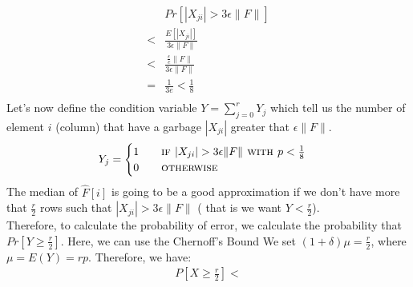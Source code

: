 \documentclass[a4paper]{article}
\begin{document}
\begin{align*}
& Pr[|X_{ji}|>   3\epsilon \|F\| ]\\
<&\frac{E[|X_{ji}|]}{3\epsilon \|F\|}\\
<& \frac{\frac{\epsilon}{e} \|F\|}{3\epsilon \|F\|}\\
=& \frac{1}{3e } < \frac{1}{8}\\
\end{align*}
Let's now define the condition variable $Y=\sum_{j=0}^r Y_j$ which tell us the number of element $i$ (column) that have a garbage $|X_{ji}|$ greater that $\epsilon \|F\|$. 
\begin{equation}
Y_{j} =  
\begin{cases} 
1 \qquad \textsc{if } |X_{ji}|>   3\epsilon \|F\|\textsc{ with } p<\frac{1}{8}\\
0 \qquad \textsc{otherwise}
\end{cases}
\nonumber
\end{equation}
The median of $\hat{F}[i]$ is going to be a good approximation if we don't have more that $\frac{r}{2}$ rows such that $|X_{ji}|>   3\epsilon \|F\|$ ( that is we want $Y < \frac{r}{2}$). \\
Therefore, to calculate the probability of error, we calculate the probability that $Pr[ Y \geq \frac{r}{2}]$. Here, we can use the Chernoff’s Bound
We set $(1 + \delta)\mu=\frac{r}{2}$, where $\mu= E(Y)=rp$. Therefore, we have:
\begin{align*}
P[X \geq \frac{r}{2}] <
\end{align*}
\end{document}
